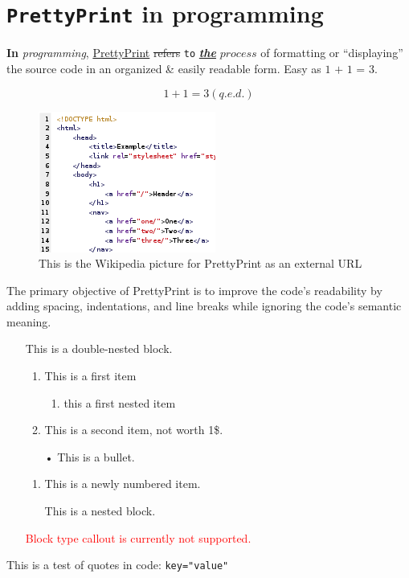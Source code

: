 \documentclass[12pt, a4paper]{article}
\makeatletter
\def\maxwidth#1{\ifdim\Gin@nat@width>#1 #1\else\Gin@nat@width\fi}
\makeatother
\begin{document}
\section{\texttt{PrettyPrint} in programming}
\textbf{In} \textit{programming}, \underline{PrettyPrint} \sout{refers} \texttt{to} \underline{\textbf{\textit{the}}} $process$ of formatting or \enquote{displaying} the source code in an organized \& easily readable form. 
 Easy as $\textit{1 + 1 = 3}$.

\begin{equation} 1 + 1 = 3 (q.e.d.)\end{equation}
\begin{figure}[h]
\includegraphics[width=\maxwidth{\linewidth}]{220px-HTML_source_code_example.png}
\centering
\caption{This is the Wikipedia picture for PrettyPrint as an external URL}
\end{figure}
The primary objective of PrettyPrint is to improve the code's readability by adding spacing, indentations, and line breaks while ignoring the code's semantic meaning.

\begin{itemize}
\item[ ] This is a double-nested block.

\begin{enumerate}
\item This is a first item
\begin{enumerate}
\item this a first nested item
\end{enumerate}
\item This is a second item, not worth 1\$.
\end{enumerate}
\begin{itemize}
\item[•] This is a bullet.
\end{itemize}
\begin{enumerate}
\item This is a newly numbered item.
\item[ ] This is a nested block.

\end{enumerate}
\end{itemize}
\begin{itemize}
\item[ ] \textcolor{red}{Block type callout is currently not supported.}

\end{itemize}
This is a test of quotes in code: \texttt{key="value"}
\end{document}
